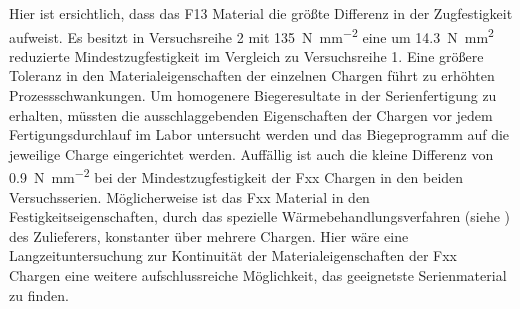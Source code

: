 \documentclass[12pt,a4paper,parskip,twoside,BCOR5mm,headsepline]{scrartcl}
\begin{document}
Hier ist ersichtlich, dass das F13 Material die größte Differenz in der Zugfestigkeit aufweist. Es besitzt in Versuchsreihe 2 mit  \SI{135}{\newton\per\milli\meter\squared} eine um \SI{14,3}{\newton\milli\meter\squared} reduzierte Mindestzugfestigkeit im Vergleich zu Versuchsreihe 1. Eine größere Toleranz in den Materialeigenschaften der einzelnen Chargen führt zu erhöhten Prozessschwankungen. Um homogenere Biegeresultate in der Serienfertigung zu erhalten,  müssten die ausschlaggebenden Eigenschaften der Chargen vor jedem Fertigungsdurchlauf im Labor untersucht werden und das Biegeprogramm auf die jeweilige Charge eingerichtet werden. Auffällig ist auch die kleine Differenz von \SI{0,9}{\newton\per\milli\meter\squared} bei der Mindestzugfestigkeit der Fxx Chargen in den beiden Versuchsserien. Möglicherweise ist das Fxx Material in den Festigkeitseigenschaften,  durch das spezielle Wärmebehandlungsverfahren (siehe ) des Zulieferers, konstanter über mehrere Chargen. Hier wäre eine Langzeituntersuchung zur  Kontinuität der Materialeigenschaften der Fxx Chargen  eine weitere aufschlussreiche Möglichkeit, das geeignetste  Serienmaterial zu finden. 
  





\newpage
\end{document}
